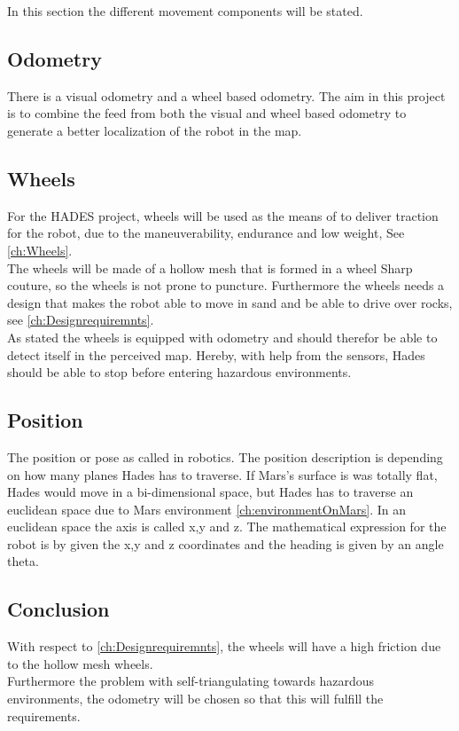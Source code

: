 In this section the different movement components will be stated.

\subsection{Odometry}
There is a visual odometry and a wheel based odometry. The aim in this project is to combine the feed from both the visual and wheel based odometry to generate a better localization of the robot in the map.

\subsection{Wheels}
For the HADES project, wheels will be used as the means of to deliver traction for the robot, due to the maneuverability, endurance and low weight, See \ref{ch:Wheels}.\\
The wheels will be made of a hollow mesh that is formed in a wheel Sharp couture, so the wheels is not prone to puncture. Furthermore the wheels needs a design that makes the robot able to move in sand and be able to drive over rocks, see \ref{ch:Designrequiremnts}. \\
As stated the wheels is equipped with odometry and should therefor be able to detect itself in the perceived map. Hereby, with help from the sensors, Hades should be able to stop before entering hazardous environments.

\subsection{Position}

The position or pose as called in robotics. The position description is  depending on how many planes Hades has to traverse. If Mars's surface is was totally flat, Hades would move in a bi-dimensional space, but Hades has to traverse an euclidean space due to Mars environment \ref{ch:environmentOnMars}.
In an euclidean space the axis is called x,y and z. The mathematical expression for the robot is by given the x,y and z coordinates and the heading is given by an angle theta.

\subsection{Conclusion}
With respect to \ref{ch:Designrequiremnts}, the wheels will have a high friction due to the hollow mesh wheels.\\
Furthermore the problem with self-triangulating towards hazardous environments, the odometry will be chosen so that this will fulfill the requirements.\\


